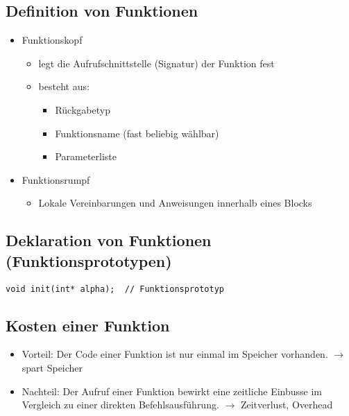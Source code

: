 \subsection{Definition von Funktionen}
\begin{itemize}
	\item Funktionskopf
	\begin{itemize}
		\item legt die Aufrufschnittstelle (Signatur) der Funktion fest
		\item besteht aus:
		\begin{itemize}
			\item Rückgabetyp
			\item Funktionsname (fast beliebig wählbar)
			\item Parameterliste
		\end{itemize}
	\end{itemize}
	\item Funktionsrumpf
	\begin{itemize}
		\item Lokale Vereinbarungen und Anweisungen innerhalb eines Blocks
	\end{itemize}
\end{itemize}

\subsection{Deklaration von Funktionen (Funktionsprototypen)}
\vspace{-\baselineskip}
\begin{minipage}{0.6\linewidth}
\vspace{-\baselineskip}
\begin{lstlisting}
void init(int* alpha);	// Funktionsprototyp
\end{lstlisting}
\end{minipage}

\subsection{Kosten einer Funktion}
\begin{itemize}
	\item Vorteil: Der Code einer Funktion ist nur einmal im Speicher vorhanden. $\rightarrow$ spart Speicher
	\item Nachteil: Der Aufruf einer Funktion bewirkt eine zeitliche Einbusse im Vergleich zu einer direkten Befehlsausführung. $\rightarrow$ Zeitverlust, Overhead
\end{itemize}

